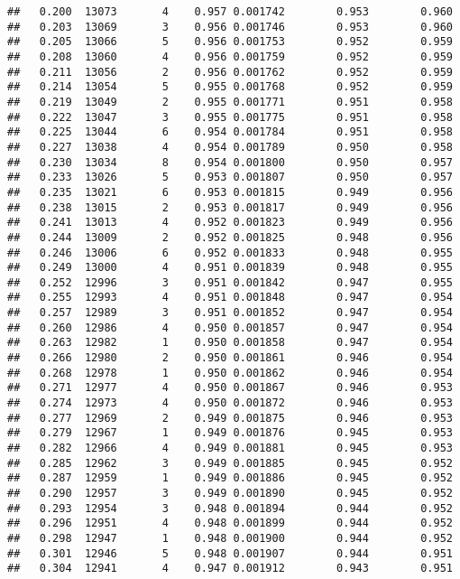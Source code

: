 \documentclass[
]{book}
\begin{document}
\begin{verbatim}
##   0.200  13073       4    0.957 0.001742        0.953        0.960
##   0.203  13069       3    0.956 0.001746        0.953        0.960
##   0.205  13066       5    0.956 0.001753        0.952        0.959
##   0.208  13060       4    0.956 0.001759        0.952        0.959
##   0.211  13056       2    0.956 0.001762        0.952        0.959
##   0.214  13054       5    0.955 0.001768        0.952        0.959
##   0.219  13049       2    0.955 0.001771        0.951        0.958
##   0.222  13047       3    0.955 0.001775        0.951        0.958
##   0.225  13044       6    0.954 0.001784        0.951        0.958
##   0.227  13038       4    0.954 0.001789        0.950        0.958
##   0.230  13034       8    0.954 0.001800        0.950        0.957
##   0.233  13026       5    0.953 0.001807        0.950        0.957
##   0.235  13021       6    0.953 0.001815        0.949        0.956
##   0.238  13015       2    0.953 0.001817        0.949        0.956
##   0.241  13013       4    0.952 0.001823        0.949        0.956
##   0.244  13009       2    0.952 0.001825        0.948        0.956
##   0.246  13006       6    0.952 0.001833        0.948        0.955
##   0.249  13000       4    0.951 0.001839        0.948        0.955
##   0.252  12996       3    0.951 0.001842        0.947        0.955
##   0.255  12993       4    0.951 0.001848        0.947        0.954
##   0.257  12989       3    0.951 0.001852        0.947        0.954
##   0.260  12986       4    0.950 0.001857        0.947        0.954
##   0.263  12982       1    0.950 0.001858        0.947        0.954
##   0.266  12980       2    0.950 0.001861        0.946        0.954
##   0.268  12978       1    0.950 0.001862        0.946        0.954
##   0.271  12977       4    0.950 0.001867        0.946        0.953
##   0.274  12973       4    0.950 0.001872        0.946        0.953
##   0.277  12969       2    0.949 0.001875        0.946        0.953
##   0.279  12967       1    0.949 0.001876        0.945        0.953
##   0.282  12966       4    0.949 0.001881        0.945        0.953
##   0.285  12962       3    0.949 0.001885        0.945        0.952
##   0.287  12959       1    0.949 0.001886        0.945        0.952
##   0.290  12957       3    0.949 0.001890        0.945        0.952
##   0.293  12954       3    0.948 0.001894        0.944        0.952
##   0.296  12951       4    0.948 0.001899        0.944        0.952
##   0.298  12947       1    0.948 0.001900        0.944        0.952
##   0.301  12946       5    0.948 0.001907        0.944        0.951
##   0.304  12941       4    0.947 0.001912        0.943        0.951

\end{verbatim}
\end{document}
